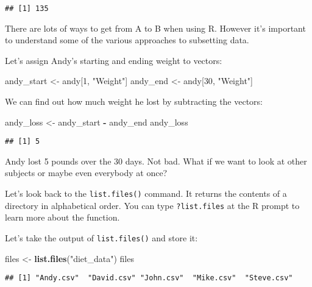 \documentclass[
]{article}
\newenvironment{Shaded}{\begin{snugshade}}{\end{snugshade}}
\newcommand{\DecValTok}[1]{\textcolor[rgb]{0.00,0.00,0.81}{#1}}
\newcommand{\KeywordTok}[1]{\textcolor[rgb]{0.13,0.29,0.53}{\textbf{#1}}}
\newcommand{\NormalTok}[1]{#1}
\newcommand{\OperatorTok}[1]{\textcolor[rgb]{0.81,0.36,0.00}{\textbf{#1}}}
\newcommand{\StringTok}[1]{\textcolor[rgb]{0.31,0.60,0.02}{#1}}
\begin{document}
\begin{verbatim}
## [1] 135
\end{verbatim}

There are lots of ways to get from A to B when using R. However it's
important to understand some of the various approaches to subsetting
data.

Let's assign Andy's starting and ending weight to vectors:

\begin{Shaded}
\begin{Highlighting}[]
\NormalTok{andy_start <-}\StringTok{ }\NormalTok{andy[}\DecValTok{1}\NormalTok{, }\StringTok{"Weight"}\NormalTok{]}
\NormalTok{andy_end <-}\StringTok{ }\NormalTok{andy[}\DecValTok{30}\NormalTok{, }\StringTok{"Weight"}\NormalTok{]}
\end{Highlighting}
\end{Shaded}

We can find out how much weight he lost by subtracting the vectors:

\begin{Shaded}
\begin{Highlighting}[]
\NormalTok{andy_loss <-}\StringTok{ }\NormalTok{andy_start }\OperatorTok{-}\StringTok{ }\NormalTok{andy_end}
\NormalTok{andy_loss}
\end{Highlighting}
\end{Shaded}

\begin{verbatim}
## [1] 5
\end{verbatim}

Andy lost 5 pounds over the 30 days. Not bad. What if we want to look at
other subjects or maybe even everybody at once?

Let's look back to the \texttt{list.files()} command. It returns the
contents of a directory in alphabetical order. You can type
\texttt{?list.files} at the R prompt to learn more about the function.

Let's take the output of \texttt{list.files()} and store it:

\begin{Shaded}
\begin{Highlighting}[]
\NormalTok{files <-}\StringTok{ }\KeywordTok{list.files}\NormalTok{(}\StringTok{"diet_data"}\NormalTok{)}
\NormalTok{files}
\end{Highlighting}
\end{Shaded}

\begin{verbatim}
## [1] "Andy.csv"  "David.csv" "John.csv"  "Mike.csv"  "Steve.csv"
\end{verbatim}
\end{document}

